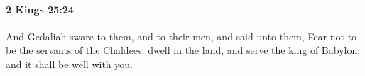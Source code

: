 
		\paragraph{2 Kings 25:24} %
			\label{2KINGS-25-24}

			And Gedaliah sware to them, and to their men, and said unto them, Fear not to be the servants of the Chaldees: dwell in the land, and serve the king of Babylon; and it shall be well with you.


